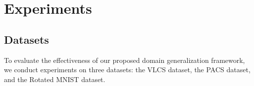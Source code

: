 \documentclass[journal]{IEEEtran}
\begin{document}
%



\section{Experiments}

\subsection{Datasets}
To evaluate the effectiveness of our proposed domain generalization framework,
we conduct experiments on three datasets: 
the VLCS \cite{fang2013unbiased} dataset, the PACS \cite{li2017deeper} dataset, and the Rotated MNIST \cite{ghifary2015domain} dataset.
\end{document}
